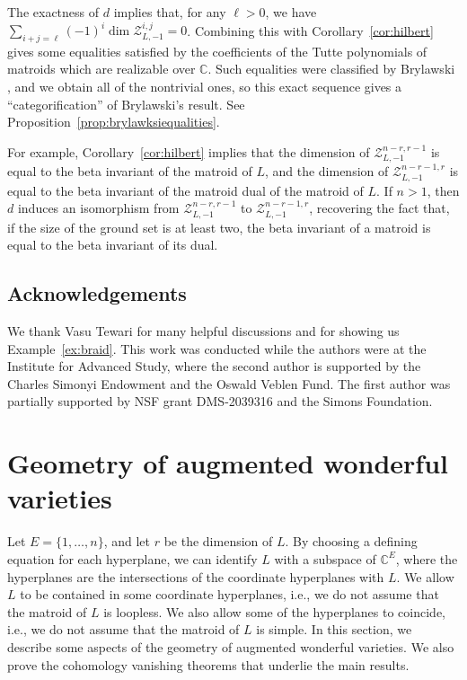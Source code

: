 \documentclass{amsart}
\theoremstyle{definition}
\begin{document}
The exactness of $d$ implies that, for any $\ell > 0$, we have $\sum_{i 
+ j = \ell} (-1)^i \dim \mathcal{Z}^{i,j}_{L, -1} = 0$. Combining this 
with Corollary~\ref{cor:hilbert} gives some equalities satisfied by the 
coefficients of the Tutte polynomials of matroids which are realizable over $\mathbb{C}$. 
Such equalities were classified by Brylawski \cite{BrylawskiEquality}, 
and we obtain all of the nontrivial ones, so this exact sequence gives a 
``categorification'' of Brylawski's result. See 
Proposition~\ref{prop:brylawksiequalities}. 

For example, Corollary~\ref{cor:hilbert} implies that the dimension of $\mathcal{Z}^{n-r, r-1}_{L, -1}$ is equal to the beta invariant of the matroid of $L$, and the dimension of $\mathcal{Z}^{n-r-1, r}_{L, -1}$ is equal to the beta invariant of the matroid dual of the matroid of $L$. If $n >1$, then $d$ induces an isomorphism from $\mathcal{Z}^{n-r, r-1}_{L, -1}$ to $\mathcal{Z}^{n-r-1, r}_{L, -1}$, recovering the fact that, if the size of the ground set is at least two, the beta invariant of a matroid is equal to the beta invariant of its dual. 

\noindent \subsection*{Acknowledgements}
We thank Vasu Tewari for many helpful discussions and for showing us Example~\ref{ex:braid}. 
This work was conducted while the authors were at the Institute for 
Advanced Study, where 
the second author is supported by the Charles 
Simonyi Endowment and the Oswald Veblen Fund. 
The first author was partially supported by NSF grant DMS-2039316 and the Simons Foundation.





\section{Geometry of augmented wonderful varieties}

Let $E = \{1, \dotsc, n\}$, and let $r$ be the dimension of $L$. 
By choosing a defining equation for each hyperplane, we can identify $L$ with a subspace of $\mathbb{C}^E$, where the hyperplanes are the intersections of the coordinate hyperplanes with $L$. We allow $L$ to be contained in some coordinate hyperplanes, i.e., we do not assume that the matroid of $L$ is loopless.  We also allow some of the hyperplanes to coincide, i.e., we do not assume that the matroid of $L$ is simple. In this section, we describe some aspects of the geometry of augmented wonderful varieties. We also prove the cohomology vanishing theorems that underlie the main results. 
\end{document}
